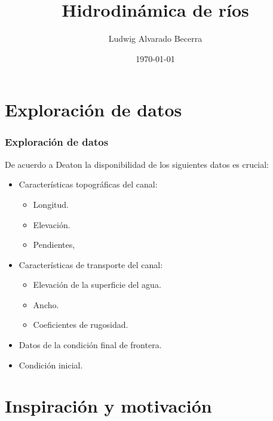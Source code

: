 \documentclass[17pt, t, lualatex]{beamer}
\title{Hidrodinámica de ríos}
\date{\today}
\institute[UJTL]{Universidad Jorge Tadeo Lozano}
\author{Ludwig Alvarado Becerra}
\begin{document}
\inserttitlepage

\section{Exploración de datos}

\insertsectionpage

\begin{frame}[allowframebreaks]
  \frametitle{Exploración de datos}
  De acuerdo a Deaton\cite{deaton1999dynamic} la disponibilidad de los siguientes datos es crucial:

  \begin{itemize}
    \item Características topográficas del canal:
          \begin{itemize}
            \item Longitud.
            \item Elevación.
            \item Pendientes,
          \end{itemize}
    \item Características de transporte del canal:
          \begin{itemize}
            \item Elevación de la superficie del agua.
            \item Ancho.
            \item Coeficientes de rugosidad.
          \end{itemize}
    \item Datos de la condición final de frontera.
    \item Condición inicial.
  \end{itemize}

\end{frame}

\section{Inspiración y motivación}

\insertsectionpage
\end{document}
